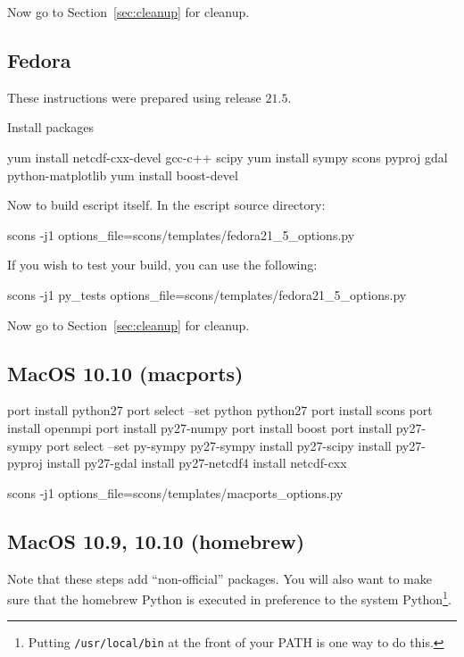 \noindent Now go to Section~\ref{sec:cleanup} for cleanup.

\subsection{Fedora}\label{sec:fedorasrc}
These instructions were prepared using release $21.5$.

\noindent Install packages
\begin{shellCode}
yum install netcdf-cxx-devel gcc-c++ scipy 
yum install sympy scons pyproj gdal python-matplotlib 
yum install boost-devel
\end{shellCode}

\noindent Now to build escript itself.
In the escript source directory:
\begin{shellCode}
scons -j1 options_file=scons/templates/fedora21_5_options.py
\end{shellCode}

\noindent If you wish to test your build, you can use the following:
\begin{shellCode}
scons -j1 py_tests options_file=scons/templates/fedora21_5_options.py 
\end{shellCode}

\noindent Now go to Section~\ref{sec:cleanup} for cleanup.

\subsection{MacOS 10.10 (macports)}\label{sec:macportsrc}

\begin{shellCode}
port install python27
port select --set python python27
port install scons
port install openmpi
port install py27-numpy
port install boost
port install py27-sympy
port select --set py-sympy py27-sympy
install py27-scipy
install py27-pyproj
install py27-gdal
install py27-netcdf4
install netcdf-cxx
\end{shellCode}

\begin{shellCode}
scons -j1 options_file=scons/templates/macports_options.py 
\end{shellCode}


\subsection{MacOS 10.9, 10.10 (homebrew)}\label{sec:homebrewsrc}

Note that these steps add ``non-official'' packages.
You will also want to make sure that the homebrew Python is executed in preference to the system 
Python\footnote{Putting \texttt{/usr/local/bin} at the front of your PATH is one way to do this.}.

